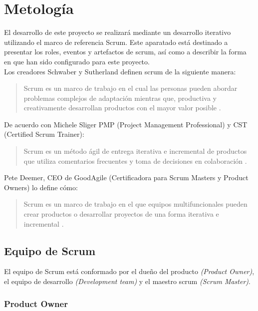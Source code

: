 \section{Metología}

 El desarrollo de este proyecto se realizará mediante un desarrollo iterativo
 utilizando el marco de referencia Scrum. Este aparatado está destinado a
 presentar los roles, eventos y artefactos de scrum, así como a describir
 la forma en que han sido configurado para este proyecto.\\

    \noindent Los creadores Schwaber y Sutherland definen scrum de la siguiente manera:
        \begin{quote}
        Scrum es un marco de trabajo en el cual las personas pueden abordar
        problemas complejos de adaptación mientras que, productiva y creativamente
        desarrollan productos con el mayor valor posible \cite{Sutherland17}.
        \end{quote}

    \noindent De acuerdo con Michele Sliger PMP (Project Management Professional) y CST (Certified Scrum Trainer):
        \begin{quote}
        Scrum es un método ágil de entrega iterativa e incremental de productos que
        utiliza comentarios frecuentes y toma de decisiones en colaboración \cite{Sliger1}.
        \end{quote}

    \noindent Pete Deemer, CEO de GoodAgile (Certificadora para Scrum Masters y Product Owners) lo define cómo:%
        \begin{quote}
        Scrum es un marco de trabajo en el que equipos multifuncionales pueden crear productos
        o desarrollar proyectos de una forma iterativa e incremental \cite{ScrumPrimer}.
        \end{quote}


\subsection{Equipo de Scrum}

 \noindent El equipo de Scrum está conformado por el dueño del producto {\em(Product Owner)},
 el equipo de desarrollo {\em(Development team)} y el maestro scrum {\em(Scrum Master)}.

\subsubsection{Product Owner} 

